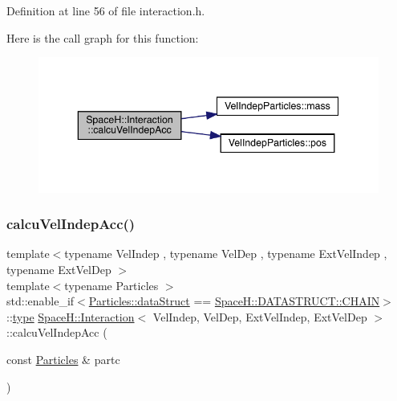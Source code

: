 Definition at line 56 of file interaction.\+h.

Here is the call graph for this function\+:\nopagebreak
\begin{figure}[H]
\begin{center}
\leavevmode
\includegraphics[width=343pt]{class_space_h_1_1_interaction_a89ebbf351411c3b9526c9890e4ff823c_cgraph}
\end{center}
\end{figure}
\mbox{\label{class_space_h_1_1_interaction_a675bfa4741648047ff36592e08a62c32}} 
\subsubsection{\texorpdfstring{calcu\+Vel\+Indep\+Acc()}{calcuVelIndepAcc()}\hspace{0.1cm}{\footnotesize\ttfamily [2/2]}}
{\footnotesize\ttfamily template$<$typename Vel\+Indep , typename Vel\+Dep , typename Ext\+Vel\+Indep , typename Ext\+Vel\+Dep $>$ \\
template$<$typename Particles $>$ \\
std\+::enable\+\_\+if$<$\mbox{\hyperlink{class_vel_indep_particles_a6d357b21c216a2b079b1927c18de0b8f}{Particles\+::data\+Struct}} == \mbox{\hyperlink{namespace_space_h_a0af19f79a6498e99dbda772053d44a72a014d2cf3cdc3af6f4f92c09190860e33}{Space\+H\+::\+D\+A\+T\+A\+S\+T\+R\+U\+C\+T\+::\+C\+H\+A\+IN}}$>$\+::\mbox{\hyperlink{class_space_h_1_1_interaction_a0bed18b8b8efcb42be264a255f931be6}{type}} \mbox{\hyperlink{class_space_h_1_1_interaction}{Space\+H\+::\+Interaction}}$<$ Vel\+Indep, Vel\+Dep, Ext\+Vel\+Indep, Ext\+Vel\+Dep $>$\+::calcu\+Vel\+Indep\+Acc (\begin{DoxyParamCaption}\item[{const \mbox{\hyperlink{struct_particles}{Particles}} \&}]{partc }\end{DoxyParamCaption})\hspace{0.3cm}{\ttfamily [inline]}}




